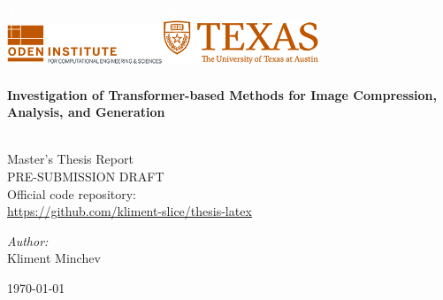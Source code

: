 \begin{titlepage}


\TITLEBOX

\begin{center}



\sffamily\textsc{\huge{\textcolor{white}{The University of Texas at Austin}}}\\[4cm]


\includegraphics[width=0.35\textwidth]{media/faculty.png}\makebox[1.5cm]{}\includegraphics[width=0.35\textwidth]{media/unilogo.png}~\\[1.5cm]



\HRule \\[0.4cm]
{
 \huge \bfseries \sffamily Investigation of Transformer-based Methods for Image Compression, Analysis, and Generation  \\[0.4cm] 
}

\HRule \\[0.4cm] 

\normalfont \LARGE \sffamily Master's Thesis Report \\[1.5cm]
\normalfont \large \sffamily PRE-SUBMISSION DRAFT \\[0.5cm]
\normalfont \large \sffamily Official code repository: \\
\normalfont \large \sffamily \url{https://github.com/kliment-slice/thesis-latex} \\[1.0cm]

\noindent
\begin{minipage}{0.4\textwidth}
\begin{center} \large
\emph{Author:}\\
Kliment Minchev\\
\end{center}
\end{minipage}

\vfill


{\large \today}

\vfill



\end{center}
\end{titlepage}

